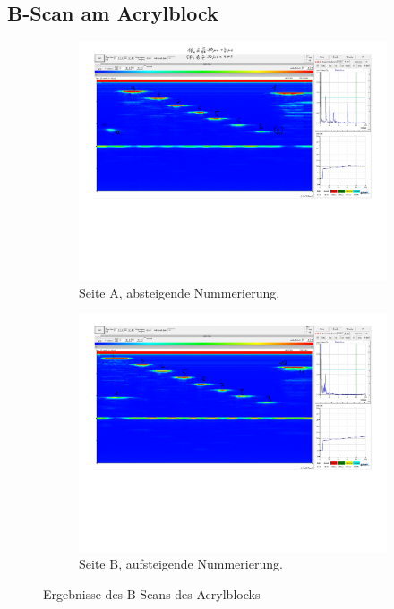 \subsection{B-Scan am Acrylblock}
\label{sec:ausw_B}
\begin{figure}[h]
    \begin{subfigure}{0.48\textwidth}
        \centering
        \includegraphics[width=\textwidth]{Abbildungen/b scan acryl 1-Copy.pdf}
        \caption{Seite A, absteigende Nummerierung.}
    \end{subfigure}
    \hfill
    \begin{subfigure}{0.48\textwidth}
        \centering
        \includegraphics[width=\textwidth]{Abbildungen/b scan acryl 1 rueckseite-Copy.pdf}
        \caption{Seite B, aufsteigende Nummerierung.}
    \end{subfigure}
    \caption{Ergebnisse des B-Scans des Acrylblocks}
    \label{fig:b-scan}
\end{figure}

